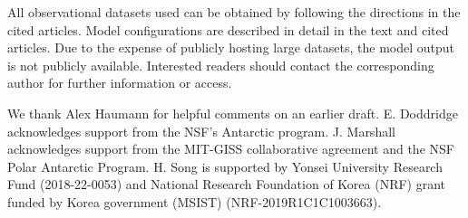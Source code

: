 \documentclass{ametsocV5}
\begin{document}


%
\datastatement
All observational datasets used can be obtained by following the directions in the cited articles. Model configurations are described in detail in the text and cited articles. Due to the expense of publicly hosting large datasets, the model output is not publicly available. Interested readers should contact the corresponding author for further information or access.

%
\acknowledgments
We thank Alex Haumann for helpful comments on an earlier draft. E. Doddridge acknowledges support from the NSF's Antarctic program. J. Marshall acknowledges support from the MIT-GISS collaborative agreement and the NSF Polar Antarctic Program. H. Song is supported by Yonsei University Research Fund (2018-22-0053) and National Research Foundation of Korea (NRF) grant funded by Korea government (MSIST) (NRF-2019R1C1C1003663).


%



\end{document}
